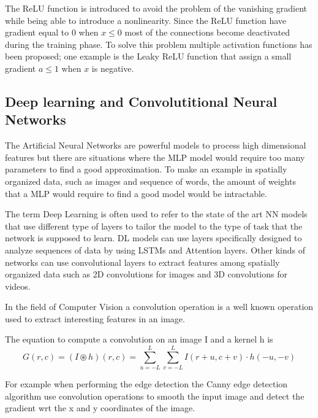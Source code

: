 \documentclass[../main.tex]{subfiles}
\begin{document}
The ReLU function is introduced to avoid the problem of the vanishing gradient while being able to introduce a nonlinearity. Since the ReLU function have gradient equal to $0$ when $x\le 0$ most of the connections become deactivated during the training phase. To solve this problem multiple activation functions has been proposed; one example is the Leaky ReLU function that assign a small gradient $a\leq 1$ when $x$ is negative.

\subsection{Deep learning and Convolutitional Neural Networks}

The Artificial Neural Networks are powerful models to process high dimensional features but there are situations where the MLP model would require too many parameters to find a good approximation. To make an example in spatially organized data, such as images and sequence of words, the amount of weights that a MLP would require to find a good model would be intractable.

The term Deep Learning is often used to refer to the state of the art NN models that use different type of layers to tailor the model to the type of task that the network is supposed to learn.
DL models can use layers specifically designed to analyze sequences of data by using LSTMs and Attention layers. 
Other kinds of networks can use convolutional layers to extract features among spatially organized data such as 2D convolutions for images and 3D convolutions for videos.

In the field of Computer Vision a convolution operation is a well known operation used to extract interesting features in an image. 

The equation to compute a convolution on an image I and a kernel h is
\begin{equation}
 G(r,c) = (I \circledast h)(r,c) = \sum_{u=-L}^L \sum_{v=-L}^{L} I(r+u,c+v) \cdot h(-u, -v)
\end{equation}

For example when performing the edge detection the Canny edge detection algorithm use convolution operations to smooth the input image and detect the gradient wrt the x and y coordinates of the image. 
\end{document}
